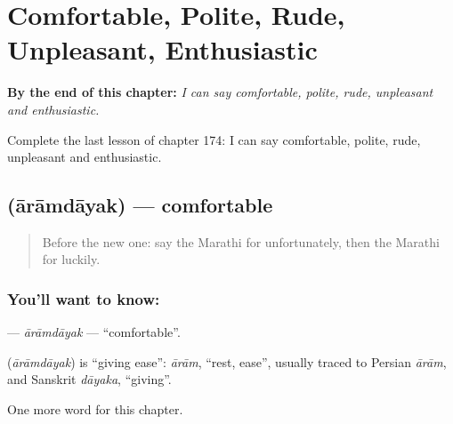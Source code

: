 
\chapter{Comfortable, Polite, Rude, Unpleasant, Enthusiastic}
\label{ch:mr-comfortable-polite-rude-unpleasant-enthusiastic}

\begin{chapteropening}
\textbf{By the end of this chapter:} \emph{I can say comfortable, polite, rude, unpleasant and enthusiastic.}

Complete the last lesson of chapter 174: I can say comfortable, polite, rude, unpleasant and enthusiastic.
\end{chapteropening}

\section[\texorpdfstring{\mr{आरामदायक} (ārāmdāyak)}{आरामदायक (ārāmdāyak)}]{ (ārāmdāyak) — comfortable}

\label{lesson:MR-C174-aramdayak}



\begin{quote}
Before the new one: say the Marathi for unfortunately, then the Marathi for luckily.
\end{quote}

\subsection*{You'll want to know: }
\textbf{} — \emph{ārāmdāyak} — \textquotedblleft{}comfortable\textquotedblright{}.

\begin{cousinweb}
\textbf{} (\emph{ārāmdāyak}) is \textquotedblleft{}giving ease\textquotedblright{}: \emph{ārām}, \textquotedblleft{}rest, ease\textquotedblright{}, usually traced to Persian \emph{ārām}, and Sanskrit \emph{dāyaka}, \textquotedblleft{}giving\textquotedblright{}.
\end{cousinweb}

\begin{grammarlens}[title={What you've built}]
One more word for this chapter.
\end{grammarlens}

